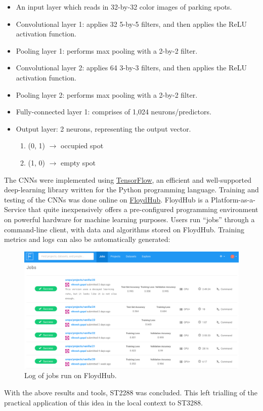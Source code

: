 \documentclass[a4paper, 11pt]{article} %
\begin{document}
	\begin{itemize}
		\item[] An input layer which reads in 32-by-32 color images of parking spots.
		\item[] Convolutional layer 1: applies 32 5-by-5 filters, and then applies the ReLU activation 
		function.
		\item[] Pooling layer 1: performs max pooling with a 2-by-2 filter.
		\item[] Convolutional layer 2: applies 64 3-by-3 filters, and then applies the ReLU activation 
		function.
		\item[] Pooling layer 2: performs max pooling with a 2-by-2 filter.
		\item[] Fully-connected layer 1: comprises of 1,024 neurons/predictors.
		\item[] Output layer: 2 neurons, representing the output vector.
		\vspace*{-4mm}
		\begin{enumerate}
			\setlength\itemsep{-3mm}
			\item[] (0, 1) $\rightarrow$ occupied spot
			\item[] (1, 0) $\rightarrow$ empty spot
		\end{enumerate}
	\end{itemize}
   	The CNNs were implemented using \href{https://www.tensorflow.org}{TensorFlow}, an efficient and 
   	well-supported deep-learning library written for the Python programming language. Training and 
   	testing of the CNNs was done online on \href{https://www.floydhub.com}{FloydHub}. FloydHub is a 
   	Platform-as-a-Service that quite inexpensively offers a pre-configured programming environment on 
   	powerful hardware for machine learning purposes. Users run ``jobs'' through a command-line client, 
   	with data and algorithms stored on FloydHub. Training metrics and logs can also be automatically 
    generated:
    \vskip 5mm
    \begin{figure}[h]
    	\centering
    	\includegraphics[width=14cm]{figures/floydhub.png}
    	\caption{Log of jobs run on FloydHub.}
    \end{figure}
	With the above results and tools, ST2288 was concluded. This left trialling of the practical 
	application of this idea in the local context to ST3288.
\end{document}
